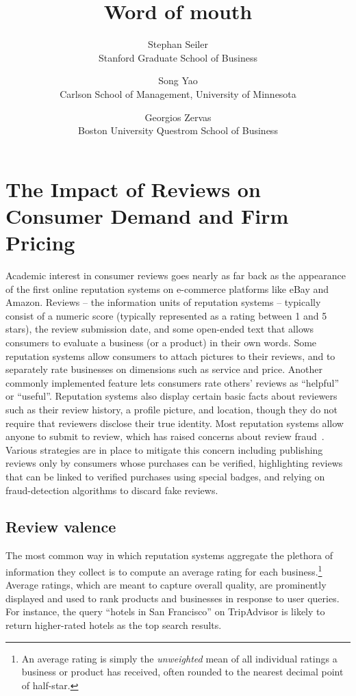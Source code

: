\documentclass[letter,12pt]{article}
\begin{document}
\title{Word of mouth}
\author{
	Stephan Seiler \\
	Stanford Graduate School of Business
	\and
	Song Yao \\
	Carlson School of Management, University of Minnesota
	\and
	Georgios Zervas \\
	Boston University Questrom School of Business
}
\maketitle

\doublespacing

\section{The Impact of Reviews on Consumer Demand and Firm Pricing}

Academic interest in consumer reviews goes nearly as far back as the
appearance of the first online reputation systems on e-commerce platforms like
eBay and Amazon. Reviews -- the information units of reputation systems --
typically consist of a numeric score (typically represented as a rating
between 1 and 5 stars), the review submission date, and some open-ended text
that allows consumers to evaluate a business (or a product) in their own
words. Some reputation systems allow consumers to attach pictures to their
reviews, and to separately rate businesses on dimensions such as service and
price. Another commonly implemented feature lets consumers rate others'
reviews as ``helpful'' or ``useful''. Reputation systems also display certain
basic facts about reviewers such as their review history, a profile picture,
and location, though they do not require that reviewers disclose their true
identity. Most reputation systems allow anyone to submit to review, which has
raised concerns about review
fraud~\citep{mayzlin2014promotional,luca2016fake}. Various strategies are in
place to mitigate this concern including publishing reviews only by consumers
whose purchases can be verified, highlighting reviews that can be linked to
verified purchases using special badges, and relying on fraud-detection
algorithms to discard fake reviews.

\subsection{Review valence}

The most common way in which reputation systems aggregate the plethora of
information they collect is to compute an average rating for each
business.\footnote{An average rating is simply the \emph{unweighted} mean of
all individual ratings a business or product has received, often rounded to
the nearest decimal point of half-star.} Average ratings, which are meant to
capture overall quality, are prominently displayed and used to rank products
and businesses in response to user queries. For instance, the query ``hotels
in San Francisco'' on TripAdvisor is likely to return higher-rated hotels as
the top search results. 
\end{document}
